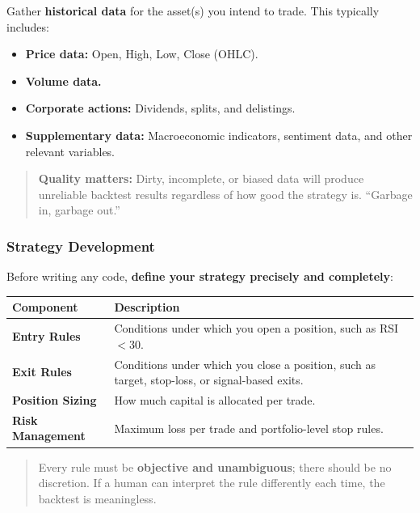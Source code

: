 \documentclass[12pt,openany]{book}
\begin{document}
Gather \textbf{historical data} for the asset(s) you intend to trade. This typically includes:
\begin{itemize}[leftmargin=*]
    \item \textbf{Price data:} Open, High, Low, Close (OHLC).
    \item \textbf{Volume data.}
    \item \textbf{Corporate actions:} Dividends, splits, and delistings.
    \item \textbf{Supplementary data:} Macroeconomic indicators, sentiment data, and other relevant variables.
\end{itemize}

\begin{quote}
    \textbf{Quality matters:} Dirty, incomplete, or biased data will produce unreliable backtest results regardless of how good the strategy is. ``Garbage in, garbage out.''
\end{quote}

\subsubsection{Strategy Development}

Before writing any code, \textbf{define your strategy precisely and completely}:

\begin{center}
\begin{tabular}{|L{0.25\textwidth}|L{0.65\textwidth}|}
\hline
\textbf{Component} & \textbf{Description} \\
\hline
\textbf{Entry Rules} & Conditions under which you open a position, such as RSI $< 30$. \\
\hline
\textbf{Exit Rules} & Conditions under which you close a position, such as target, stop-loss, or signal-based exits. \\
\hline
\textbf{Position Sizing} & How much capital is allocated per trade. \\
\hline
\textbf{Risk Management} & Maximum loss per trade and portfolio-level stop rules. \\
\hline
\end{tabular}
\end{center}

\begin{quote}
    Every rule must be \textbf{objective and unambiguous}; there should be no discretion. If a human can interpret the rule differently each time, the backtest is meaningless.
\end{quote}
\end{document}
